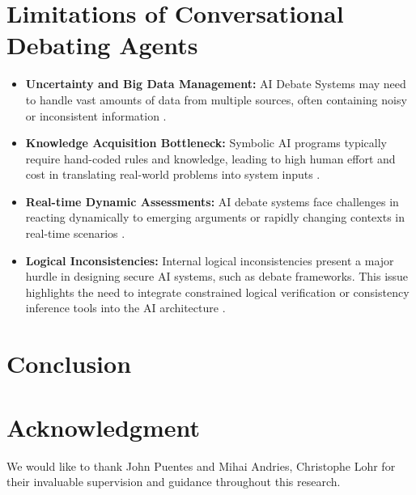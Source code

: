 \documentclass[conference]{IEEEtran}
\begin{document}
\section{Limitations of Conversational Debating Agents}
\begin{itemize}
    \item \textbf{Uncertainty and Big Data Management:} AI Debate Systems may need to handle vast amounts of data from multiple sources, often containing noisy or inconsistent information \cite{b10}.
    
    \item \textbf{Knowledge Acquisition Bottleneck:} Symbolic AI programs typically require hand-coded rules and knowledge, leading to high human effort and cost in translating real-world problems into system inputs \cite{b10}.
    
    \item \textbf{Real-time Dynamic Assessments:} AI debate systems face challenges in reacting dynamically to emerging arguments or rapidly changing contexts in real-time scenarios \cite{b10}.
    
    \item \textbf{Logical Inconsistencies:} Internal logical inconsistencies present a major hurdle in designing secure AI systems, such as debate frameworks. This issue highlights the need to integrate constrained logical verification or consistency inference tools into the AI architecture \cite{b9}.
\end{itemize}



\section{Conclusion}

\section*{Acknowledgment}
We would like to thank John Puentes and Mihai Andries, Christophe Lohr for their invaluable supervision and guidance throughout this research.
\end{document}
